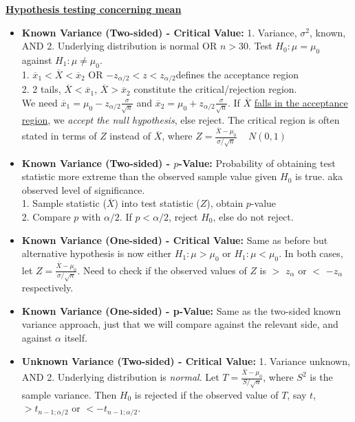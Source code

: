 \documentclass[10pt,landscape]{article}
\begin{document}
\begin{multicols*}{3}
\textbf{\underline{Hypothesis testing concerning mean}} \\ 
\begin{itemize}[topsep=0pt,noitemsep,wide=0pt, leftmargin=\dimexpr{} + 2\relax]
    \item \textbf{Known Variance (Two-sided) - Critical Value:} 1. Variance, $\sigma^2$, known, AND
    2. Underlying distribution is normal OR $n>30$. Test $H_0:\mu=\mu_0$ against $H_1:\mu\neq\mu_0$.  \\

    1. $\overline{x}_1<\overline{X}<\overline{x}_2$ OR $-z_{\alpha/2} < z < z_{\alpha/2}$defines the acceptance region \\ 
    2. 2 tails, $\overline{X}<\overline{x}_1$, $\overline{X}>\overline{x}_2$ constitute the critical/rejection region. \\

    We need $\overline{x}_1=\mu_0-z_{\alpha/2}\frac{\sigma}{\sqrt{n}}$ and $\overline{x}_2=\mu_0+z_{\alpha/2}\frac{\sigma}{\sqrt{n}}$.
    If $\overline{X}$ \underline{falls in the acceptance region}, we \textit{accept the null hypothesis}, else reject. The critical region is often stated in terms of $Z$ instead of $\overline{X}$, where
    $Z=\frac{\overline{X}-\mu_0}{\sigma/\sqrt{n}}$ ~ $N(0,1)$

    \item \textbf{Known Variance (Two-sided) - $p$-Value:} Probability of obtaining test statistic more extreme than the observed sample value given $H_0$ is true. aka observed level of significance. \\
    1. Sample statistic ($\overline{X}$) into test statistic ($Z$), obtain $p$-value \\ 
    2. Compare $p$ with $\alpha/2$. If $p < \alpha/2$, reject $H_0$, else do not reject.
    
    \item \textbf{Known Variance (One-sided) - Critical Value:} Same as before but alternative hypothesis is now either $H_1:\mu>\mu_0$ or $H_1:\mu<\mu_0$.
    In both cases, let $Z=\frac{\overline{X}-\mu_0}{\sigma/\sqrt{n}}$. Need to check if the observed values of $Z$ is $>$ $z_\alpha$ or $<$ $-z_\alpha$ respectively.

    \item \textbf{Known Variance (One-sided) - p-Value:} Same as the two-sided known variance approach, just that we will compare against the relevant side, and against $\alpha$ itself.
    
    \item \textbf{Unknown Variance (Two-sided) - Critical Value:} 1. Variance unknown, AND 2. Underlying distribution is \textit{normal}. Let $T=\frac{\overline{X}-\mu_0}{S/\sqrt{n}}$, where $S^2$ is the sample variance.
    Then $H_0$ is rejected if the observed value of $T$, say $t$, $>t_{n-1;\alpha/2}$ or $<-t_{n-1;\alpha/2}$.


\end{itemize}
\end{multicols*}
\end{document}
